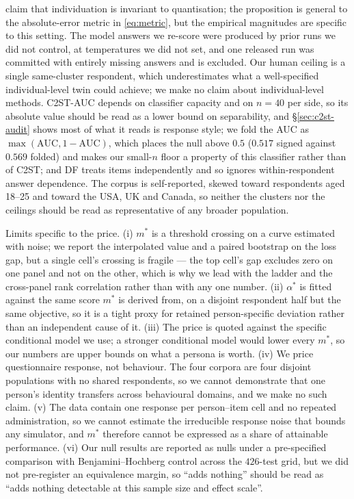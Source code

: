 \documentclass[11pt]{article}
\begin{document}
claim that individuation is invariant to quantisation; the proposition is general
to the
absolute-error metric in \eqref{eq:metric}, but the empirical magnitudes are
specific to this setting. The model answers we re-score were produced by prior
runs we did not control, at temperatures we did not set, and one released run was
committed with entirely missing answers and is excluded. Our human ceiling is a
single same-cluster respondent, which underestimates what a well-specified
individual-level twin could achieve; we make no claim about individual-level
methods. C2ST-AUC depends on classifier capacity and on $n{=}40$ per side, so its
absolute value should be read as a lower bound on separability, and
\S\ref{sec:c2st-audit} shows most of what it reads is response style; we fold the
AUC as $\max(\mathrm{AUC},1-\mathrm{AUC})$, which places the null above $0.5$
($0.517$ signed against $0.569$ folded) and makes our small-$n$ floor a property
of this classifier rather than of C2ST; and DF treats
items independently and so ignores within-respondent answer dependence. The
corpus is self-reported, skewed toward respondents aged 18--25 and toward the
USA, UK and Canada, so neither the clusters nor the ceilings should be read as
representative of any broader population.

Limits specific to the price. (i) $m^{*}$ is a threshold crossing on a curve
estimated with noise; we report the interpolated value and a paired bootstrap on
the loss gap, but a single cell's crossing is fragile --- the top cell's gap
excludes zero on one panel and not on the other, which is why we lead with the
ladder and the cross-panel rank correlation rather than with any one number.
(ii) $\alpha^{*}$ is fitted against the same score $m^{*}$ is derived from, on a
disjoint respondent half but the same objective, so it is a tight proxy for
retained person-specific deviation rather than an independent cause of it.
(iii) The price is quoted against the specific conditional model we use; a
stronger conditional model would lower every $m^{*}$, so our numbers are upper
bounds on what a persona is worth. (iv) We price questionnaire response, not
behaviour. The four corpora are four disjoint populations with no shared
respondents, so we cannot demonstrate that one person's identity transfers
across behavioural domains, and we make no such claim. (v) The data contain one
response per person--item cell and no repeated administration, so we cannot
estimate the irreducible response noise that bounds any simulator, and $m^{*}$
therefore cannot be expressed as a share of attainable performance.
(vi) Our null results are reported as nulls under a pre-specified comparison with
Benjamini--Hochberg control across the $426$-test grid, but we did not
pre-register an equivalence margin, so ``adds nothing'' should be read as
``adds nothing detectable at this sample size and effect scale''.
\end{document}
